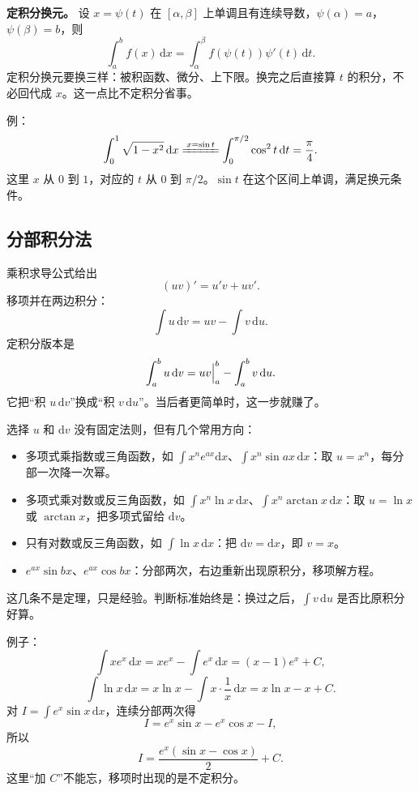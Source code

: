 \noindent\textbf{定积分换元。} 设 \(x=\psi(t)\) 在 \([\alpha,\beta]\) 上单调且有连续导数，\(\psi(\alpha)=a\)，\(\psi(\beta)=b\)，则
\[
  \int_a^b f(x)\,\mathrm{d}x=\int_\alpha^\beta f(\psi(t))\psi'(t)\,\mathrm{d}t .
\]
定积分换元要换三样：被积函数、微分、上下限。换完之后直接算 \(t\) 的积分，不必回代成 \(x\)。这一点比不定积分省事。

例：
\[
  \int_0^1\sqrt{1-x^2}\,\mathrm{d}x
  \xlongequal{x=\sin t}\int_0^{\pi/2}\cos^2t\,\mathrm{d}t
  =\frac{\pi}{4}.
\]
这里 \(x\) 从 \(0\) 到 \(1\)，对应的 \(t\) 从 \(0\) 到 \(\pi/2\)。\(\sin t\) 在这个区间上单调，满足换元条件。

\subsection{分部积分法}

乘积求导公式给出
\[
  (uv)'=u'v+uv'.
\]
移项并在两边积分：
\[
  \boxed{\int u\,\mathrm{d}v=uv-\int v\,\mathrm{d}u.}
\]
定积分版本是
\[
  \int_a^b u\,\mathrm{d}v=\Bigl.uv\Bigr|_a^b-\int_a^b v\,\mathrm{d}u .
\]
它把“积 \(u\,\mathrm{d}v\)”换成“积 \(v\,\mathrm{d}u\)”。当后者更简单时，这一步就赚了。

选择 \(u\) 和 \(\mathrm{d}v\) 没有固定法则，但有几个常用方向：
\begin{itemize}
  \item 多项式乘指数或三角函数，如 \(\int x^ne^{ax}\mathrm{d}x\)、\(\int x^n\sin ax\,\mathrm{d}x\)：取 \(u=x^n\)，每分部一次降一次幂。
  \item 多项式乘对数或反三角函数，如 \(\int x^n\ln x\,\mathrm{d}x\)、\(\int x^n\arctan x\,\mathrm{d}x\)：取 \(u=\ln x\) 或 \(\arctan x\)，把多项式留给 \(\mathrm{d}v\)。
  \item 只有对数或反三角函数，如 \(\int\ln x\,\mathrm{d}x\)：把 \(\mathrm{d}v=\mathrm{d}x\)，即 \(v=x\)。
  \item \(e^{ax}\sin bx\)、\(e^{ax}\cos bx\)：分部两次，右边重新出现原积分，移项解方程。
\end{itemize}
这几条不是定理，只是经验。判断标准始终是：换过之后，\(\int v\,\mathrm{d}u\) 是否比原积分好算。

例子：
\[
  \int x e^x\,\mathrm{d}x=xe^x-\int e^x\,\mathrm{d}x=(x-1)e^x+C,
\]
\[
  \int \ln x\,\mathrm{d}x=x\ln x-\int x\cdot\frac{1}{x}\,\mathrm{d}x=x\ln x-x+C.
\]
对 \(I=\int e^x\sin x\,\mathrm{d}x\)，连续分部两次得
\[
  I=e^x\sin x-e^x\cos x-I,
\]
所以
\[
  I=\frac{e^x(\sin x-\cos x)}{2}+C.
\]
这里“加 \(C\)”不能忘，移项时出现的是不定积分。

